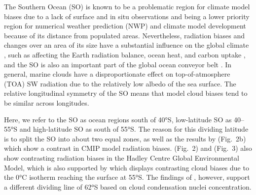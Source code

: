 \documentclass[draft]{agujournal2019}
\begin{document}
The Southern Ocean (SO) is known to be a problematic region for climate model biases \cite{schuddeboom2021,hyder2018,cesana2022,zhao2022} due to a lack of surface and in situ observations and being a lower priority region for numerical weather prediction (NWP) and climate model development because of its distance from populated areas. Nevertheless, radiation biases and changes over an area of its size have a substantial influence on the global climate \cite{rintoul2011}, such as affecting the Earth radiation balance, ocean heat, and carbon uptake \cite{williams2023}, and the SO is also an important part of the global ocean conveyor belt \cite{wang2014b}. In general, marine clouds have a disproportionate effect on top-of-atmosphere (TOA) SW radiation due to the relatively low albedo of the sea surface. The relative longitudinal symmetry of the SO means that model cloud biases tend to be similar across longitudes.

Here, we refer to the SO as ocean regions south of 40°S, low-latitude SO as 40--55°S and high-latitude SO as south of 55°S. The reason for this dividing latitude is to split the SO into about two equal zones, as well as the results by  (Fig.~2b) which show a contrast in CMIP model radiation biases.  (Fig.~2) and  (Fig.~3) also show contrasting radiation biases in the Hadley Centre Global Environmental Model, which is also supported by  which displays contrasting cloud biases due to the 0°C isotherm reaching the surface at 55°S. The findings of , however, support a different dividing line of 62°S based on cloud condensation nuclei concentration.
\end{document}
